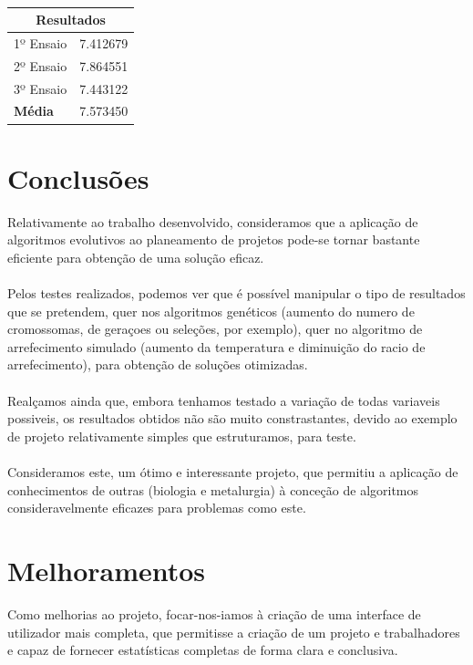 \documentclass[a4paper]{article}
\begin{document}
\paragraph{}
\begin{center}
	\begin{tabular}{ |l|l| }
		\hline
		\multicolumn{2}{|c|}{Resultados} \\
		\hline
		1º Ensaio & 7.412679 \\
		2º Ensaio & 7.864551 \\
		3º Ensaio & 7.443122 \\
		\textbf{Média} & 7.573450 \\
		\hline
	\end{tabular}
\end{center}

\newpage
\section{Conclusões}
Relativamente ao trabalho desenvolvido, consideramos que a aplicação de algoritmos evolutivos ao planeamento de projetos pode-se tornar bastante eficiente para obtenção de uma solução eficaz.
\paragraph{}
Pelos testes realizados, podemos ver que é possível manipular o tipo de resultados que se pretendem, quer nos algoritmos genéticos (aumento do numero de cromossomas, de geraçoes ou seleções, por exemplo), quer no algoritmo de arrefecimento simulado (aumento da temperatura e diminuição do racio de arrefecimento), para obtenção de soluções otimizadas.
\paragraph{}
Realçamos ainda que, embora tenhamos testado a variação de todas variaveis possiveis, os resultados obtidos não são muito constrastantes, devido ao exemplo de projeto relativamente simples que estruturamos, para teste.
\paragraph{}
Consideramos este, um ótimo e interessante projeto, que permitiu a aplicação de conhecimentos de outras (biologia e metalurgia) à conceção de algoritmos consideravelmente eficazes para problemas como este.

\section{Melhoramentos}
Como melhorias ao projeto, focar-nos-iamos à criação de uma interface de utilizador mais completa, que permitisse a criação de um projeto e trabalhadores e capaz de fornecer estatísticas completas de forma clara e conclusiva.

\clearpage
{}
\renewcommand\refname{Bibliografia}


\end{document}
